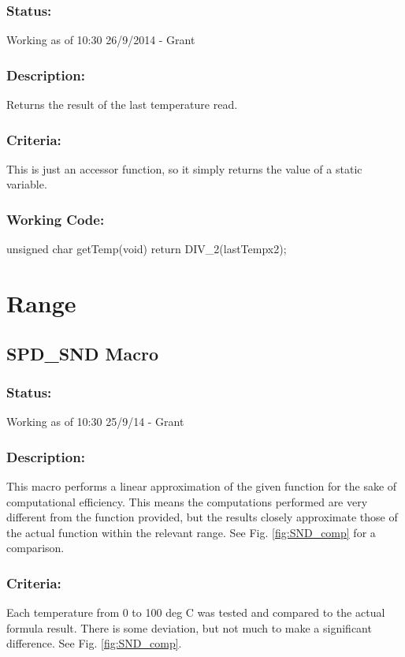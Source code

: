 \documentclass[]{article}
\begin{document}
\subsubsection{Status:}
Working as of 10:30 26/9/2014 - Grant

\subsubsection{Description:}
Returns the result of the last temperature read.

\subsubsection{Criteria:}
This is just an accessor function, so it simply returns the value of a static variable.

\subsubsection{Working Code:}
unsigned char getTemp(void) \newline
{ \newline
	return DIV\_2(lastTempx2); \newline
} \newline

\newpage
\section{Range}

\subsection{SPD\_SND Macro}
\subsubsection{Status:}
Working as of 10:30 25/9/14 - Grant

\subsubsection{Description:}
This macro performs a linear approximation of the given function for the sake of computational efficiency. This means the computations performed are very different from the function provided, but the results closely approximate those of the actual function within the relevant range. See Fig. \ref{fig:SND_comp} for a comparison.

\subsubsection{Criteria:}
Each temperature from 0 to 100 deg C was tested and compared to the actual formula result. There is some deviation, but not much to make a significant difference. See Fig. \ref{fig:SND_comp}.\newline 
\end{document}
